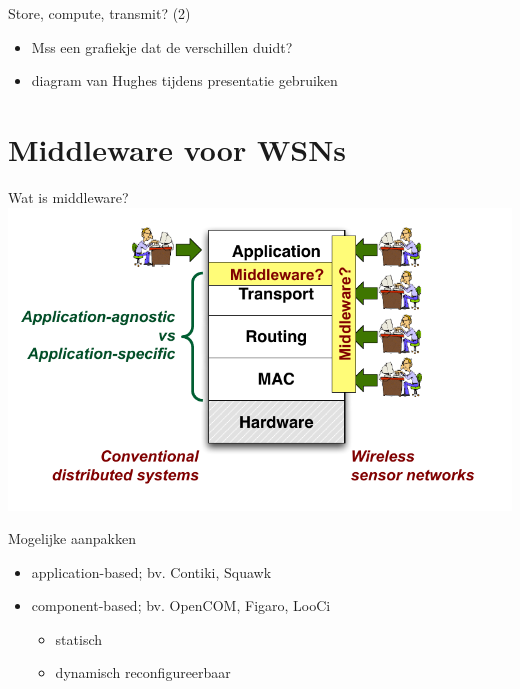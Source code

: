 \documentclass[presentation, bigger]{beamer}
\begin{document}
\begin{frame}[label=sec-1-8]{Store, compute, transmit? (2)}
\begin{itemize}
\item Mss een grafiekje dat de verschillen duidt?
\item diagram van Hughes tijdens presentatie gebruiken
\end{itemize}
\end{frame}
\section{Middleware voor WSNs}
\label{sec-2}
\begin{frame}[label=sec-2-1]{Wat is middleware?}
\includegraphics[width=\textwidth,keepaspectration=true]{middleware}
\end{frame}

\begin{frame}[label=sec-2-2]{Mogelijke aanpakken}
\begin{itemize}
\item application-based; bv. Contiki, Squawk
\item component-based; bv. OpenCOM, Figaro, LooCi
\begin{itemize}
\item statisch
\item dynamisch reconfigureerbaar
\end{itemize}
\end{itemize}
\end{frame}
\end{document}
